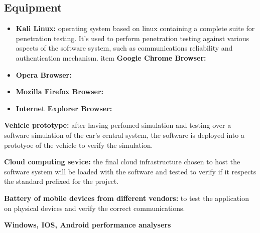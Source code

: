 \subsection{Equipment}

\begin{itemize}
	\item \textbf{Kali Linux:} operating system based on linux containing a complete suite for penetration testing. It's used to perform penetration testing against various aspects of the software system, such as communications reliability and authentication mechanism.
 item \textbf{Google Chrome Browser:}
	\item \textbf{Opera Browser:}
	\item \textbf{Mozilla Firefox Browser:}
	\item \textbf{Internet Explorer Browser:}
\end{itemize}

\textbf{Vehicle prototype:} after having perfomed simulation and testing over a software simulation of the car's central system, the software is deployed into a prototyoe of the vehicle to verify the simulation.

\textbf{Cloud computing sevice:} the final cloud infrastructure chosen to host the software system will be loaded with the software and tested to verify if it respects the standard prefixed for the project.

\textbf{Battery of mobile devices from different vendors:} to test the application on physical devices and verify the correct communications.

\textbf{Windows, IOS, Android performance analysers}
